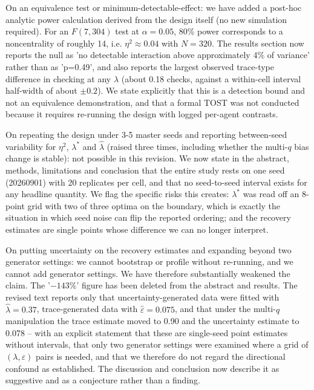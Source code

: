 \documentclass[11pt,a4paper]{article}
\begin{document}
On an equivalence test or minimum-detectable-effect: we have added a post-hoc analytic power calculation derived from the design itself (no new simulation required). For an $F(7,304)$ test at $\alpha=0.05$, 80\% power corresponds to a noncentrality of roughly 14, i.e. $\eta^2 \approx 0.04$ with $N=320$. The results section now reports the null as 'no detectable interaction above approximately 4\% of variance' rather than as 'p=0.49', and also reports the largest observed trace-type difference in checking at any $\lambda$ (about 0.18 checks, against a within-cell interval half-width of about $\pm 0.2$). We state explicitly that this is a detection bound and not an equivalence demonstration, and that a formal TOST was not conducted because it requires re-running the design with logged per-agent contrasts.

On repeating the design under 3-5 master seeds and reporting between-seed variability for $\eta^2$, $\lambda^{*}$ and $\hat{\lambda}$ (raised three times, including whether the multi-$q$ bias change is stable): not possible in this revision. We now state in the abstract, methods, limitations and conclusion that the entire study rests on one seed (20260901) with 20 replicates per cell, and that no seed-to-seed interval exists for any headline quantity. We flag the specific risks this creates: $\lambda^{*}$ was read off an 8-point grid with two of three optima on the boundary, which is exactly the situation in which seed noise can flip the reported ordering; and the recovery estimates are single points whose difference we can no longer interpret.

On putting uncertainty on the recovery estimates and expanding beyond two generator settings: we cannot bootstrap or profile without re-running, and we cannot add generator settings. We have therefore substantially weakened the claim. The '$-143\%$' figure has been deleted from the abstract and results. The revised text reports only that uncertainty-generated data were fitted with $\hat{\lambda}=0.37$, trace-generated data with $\hat{\varepsilon}=0.075$, and that under the multi-$q$ manipulation the trace estimate moved to 0.90 and the uncertainty estimate to 0.078 -- with an explicit statement that these are single-seed point estimates without intervals, that only two generator settings were examined where a grid of $(\lambda,\varepsilon)$ pairs is needed, and that we therefore do not regard the directional confound as established. The discussion and conclusion now describe it as suggestive and as a conjecture rather than a finding.
\end{document}
